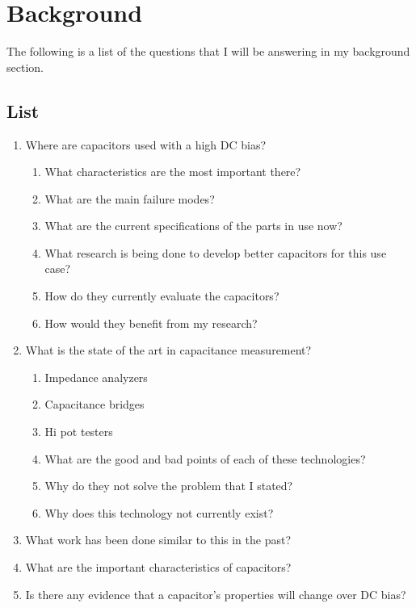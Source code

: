 \section {Background}

The following is a list of the questions that I will be answering in my background section.

\subsection{List}
\begin {enumerate}
    \item Where are capacitors used with a high DC bias?
    \begin {enumerate}
        \item What characteristics are the most important there?
        \item What are the main failure modes?
        \item What are the current specifications of the parts in use now?
        \item What research is being done to develop better capacitors for this use case?
        \item How do they currently evaluate the capacitors?
        \item How would they benefit from my research?
    \end {enumerate}
    \item What is the state of the art in capacitance measurement?
    \begin {enumerate}
        \item Impedance analyzers
        \item Capacitance bridges
        \item Hi pot testers
        \item What are the good and bad points of each of these technologies?
        \item Why do they not solve the problem that I stated? 
        \item Why does this technology not currently exist?
    \end {enumerate}
    \item What work has been done similar to this in the past?
    \item What are the important characteristics of capacitors?
    \item Is there any evidence that a capacitor's properties will change over DC bias?
\end {enumerate}


